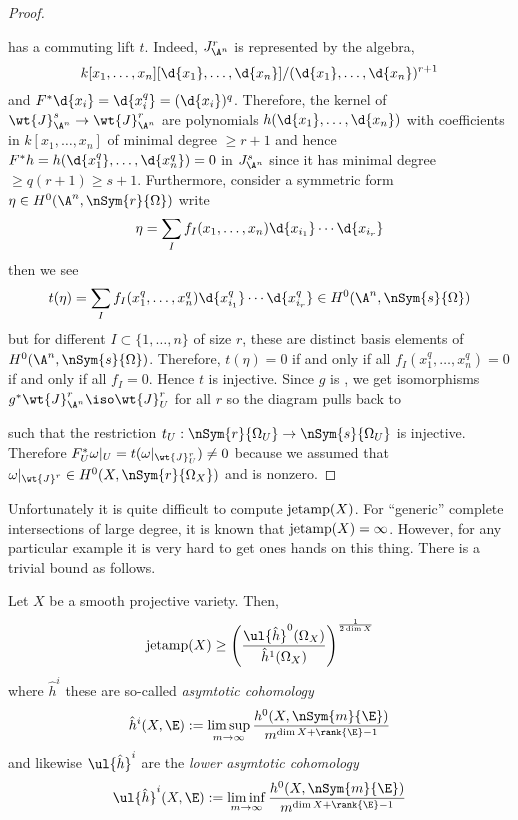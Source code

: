\documentclass[12pt]{article}
\begin{document}
\begin{proof}
\begin{center}
\end{center}
has a commuting lift $t$. Indeed, $J^r_{\A^n}$ is represented by the algebra,
\[ k[x_1, \dots, x_n][\d{x_1}, \dots, \d{x_n}] / (\d{x_1}, \dots, \d{x_n})^{r+1} \] and $F^* \d{x_i} = \d{x_i^{q}} = (\d{x_i})^{q}$. Therefore, the kernel of $\wt{J}^s_{\A^n} \to \wt{J}^r_{\A^n}$ are polynomials $h(\d{x_1}, \dots, \d{x_n})$ with coefficients in $k[x_1, \dots, x_n]$ of minimal degree $\ge r + 1$ and hence $F^* h = h(\d{x_1^{q}}, \dots, \d{x_n^{q}}) = 0$ in $J^s_{\A^n}$ since it has minimal degree $\ge q (r + 1) \ge s + 1$. Furthermore, consider a symmetric form $\eta \in H^0(\A^n, \nSym{r}{\Omega})$ write
\[ \eta = \sum_{I} f_I(x_1, \dots, x_n) \d{x_{i_1}} \cdots \d{x_{i_r}} \]
then we see
\[ t(\eta) = \sum_I f_I(x_1^q, \dots, x_n^q) \d{x_{i_1}^q} \cdots \d{x_{i_r}^q} \in H^0(\A^n, \nSym{s}{\Omega}) \]
but for different $I \subset \{1, \dots, n\}$ of size $r$, these are distinct basis elements of $H^0(\A^n, \nSym{s}{\Omega})$. Therefore, $t(\eta) = 0$ if and only if all $f_I(x_1^q, \dots, x_n^q) = 0$ if and only if all $f_I = 0$. Hence $t$ is injective. Since $g$ is \etale, we get isomorphisms $g^* \wt{J}_{\A^n}^r \iso \wt{J}^r_{U}$ for all $r$ so the diagram pulls back to
\begin{center}
\end{center}
such that the restriction $t_U : \nSym{r}{\Omega_U} \to \nSym{s}{\Omega_U}$ is injective. Therefore $F^*_U \omega|_U = t(\omega|_{\wt{J}^r_U}) \neq 0$ because we assumed that $\omega|_{\wt{J}^r} \in H^0(X, \nSym{r}{\Omega_X})$ and is nonzero.
\end{proof}

Unfortunately it is quite difficult to compute $\mathrm{jetamp}(X)$. For ``generic'' complete intersections of large degree, it is known that $\mathrm{jetamp}(X) = \infty$. However, for any particular example it is very hard to get ones hands on this thing. There is a trivial bound as follows.


\begin{prop}
Let $X$ be a smooth projective variety. Then,
\[ \jetamp(X) \ge \left(\frac{\ul{\hat{h}}^0(\Omega_X)}{\hat{h}^1(\Omega_X)}\right)^{\frac{1}{2 \dim{X}}} \]
where $\hat{h}^i$ these are so-called \textit{asymtotic cohomology}
\[ \hat{h}^i(X, \E) := \limsup_{m \to \infty} \frac{h^0(X, \nSym{m}{\E})}{m^{\dim{X} + \rank{\E} - 1}} \]
and likewise $\ul{\hat{h}}^i$ are the \textit{lower asymtotic cohomology}
\[ \ul{\hat{h}}^i(X, \E) := \liminf_{m \to \infty} \frac{h^0(X, \nSym{m}{\E})}{m^{\dim{X} + \rank{\E} - 1}} \]
\end{prop}
\end{document}
